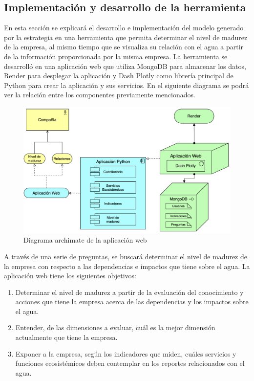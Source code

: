\subsection{Implementación y desarrollo de la herramienta} \label{subsec:implementacion-desarrollo-herramienta}

En esta sección se explicará el desarrollo e implementación del modelo generado por la estrategia en una herramienta que permita determinar el nivel de madurez de la empresa, al mismo tiempo que se visualiza su relación con el agua a partir de la información proporcionada por la misma empresa. La herramienta se desarrolló en una aplicación web que utiliza MongoDB para almacenar los datos, Render para desplegar la aplicación y Dash Plotly como librería principal de Python para crear la aplicación y sus servicios. En el siguiente diagrama se podrá ver la relación entre los componentes previamente mencionados. 

\begin{figure}[H]
    \centering
    \includegraphics[scale=0.45]{images/5-implementacion/diagrama-archimate.png}
    \caption{Diagrama archimate de la aplicación web}
    \label{fig:archimate-app-web}
\end{figure}

A través de una serie de preguntas, se buscará determinar el nivel de madurez de la empresa con respecto a las dependencias e impactos que tiene sobre el agua. La aplicación web tiene los siguientes objetivos:

\begin{enumerate}
    \item Determinar el nivel de madurez a partir de la evaluación del conocimiento y acciones que tiene la empresa acerca de las dependencias y los impactos sobre el agua.
    \item Entender, de las dimensiones a evaluar, cuál es la mejor dimensión actualmente que tiene la empresa.
    \item Exponer a la empresa, según los indicadores que miden, cuáles servicios y funciones ecosistémicos deben contemplar en los reportes relacionados con el agua.
\end{enumerate}

